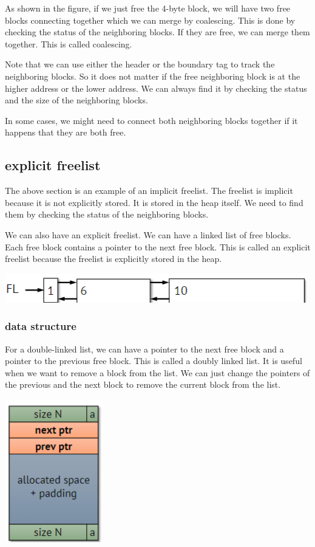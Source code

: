 \documentclass[letterpaper,12pt]{article}
\begin{document}
As shown in the figure, if we just free the 4-byte block, we will have two free
blocks connecting together which we can merge by coalescing. This is done by
checking the status of the neighboring blocks. If they are free, we can merge
them together. This is called coalescing.

Note that we can use either the header or the boundary tag to track the
neighboring blocks. So it does not matter if the free neighboring block is at
the higher address or the lower address. We can always find it by checking the
status and the size of the neighboring blocks.

In some cases, we might need to connect both neighboring blocks together if it
happens that they are both free.
\subsection{explicit freelist}
The above section is an example of an implicit freelist. The freelist is
implicit because it is not explicitly stored. It is stored in the heap itself.
We need to find them by checking the status of the neighboring blocks.

We can also have an explicit freelist. We can have a linked list of free
blocks. Each free block contains a pointer to the next free block. This is
called an explicit freelist because the freelist is explicitly stored in the
heap.

\includegraphics{Images/Doble-linked explicit freelist.png}
\subsubsection{data structure}
For a double-linked list, we can have a pointer to the next free block and a
pointer to the previous free block. This is called a doubly linked list. It is
useful when we want to remove a block from the list. We can just change the
pointers of the previous and the next block to remove the current block from
the list.

\includegraphics{Images/explicit freelist data structure.png}
\end{document}
